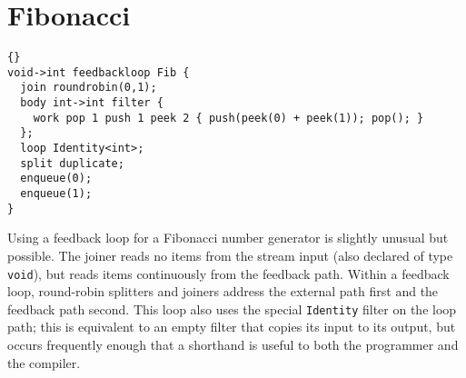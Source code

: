 \section{Fibonacci}

\begin{lstlisting}{}
void->int feedbackloop Fib {
  join roundrobin(0,1);
  body int->int filter { 
    work pop 1 push 1 peek 2 { push(peek(0) + peek(1)); pop(); }
  };
  loop Identity<int>;
  split duplicate;
  enqueue(0);
  enqueue(1);
}
\end{lstlisting}

Using a feedback loop for a Fibonacci number generator is slightly
unusual but possible.  The joiner reads no items from the stream input
(also declared of type \lstinline|void|), but reads items continuously
from the feedback path.  Within a feedback loop, round-robin splitters
and joiners address the external path first and the feedback path
second.  This loop also uses the special \lstinline|Identity| filter
on the loop path; this is equivalent to an empty filter that copies
its input to its output, but occurs frequently enough that a shorthand
is useful to both the programmer and the compiler.

